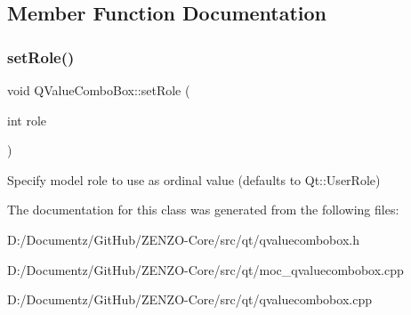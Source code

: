\subsection{Member Function Documentation}
\mbox{\label{class_q_value_combo_box_a9db5bc48951130e1104322de54f55471}} 
\subsubsection{\texorpdfstring{setRole()}{setRole()}}
{\footnotesize\ttfamily void Q\+Value\+Combo\+Box\+::set\+Role (\begin{DoxyParamCaption}\item[{int}]{role }\end{DoxyParamCaption})}

Specify model role to use as ordinal value (defaults to Qt\+::\+User\+Role) 

The documentation for this class was generated from the following files\+:\begin{DoxyCompactItemize}
\item 
D\+:/\+Documentz/\+Git\+Hub/\+Z\+E\+N\+Z\+O-\/\+Core/src/qt/qvaluecombobox.\+h\item 
D\+:/\+Documentz/\+Git\+Hub/\+Z\+E\+N\+Z\+O-\/\+Core/src/qt/moc\+\_\+qvaluecombobox.\+cpp\item 
D\+:/\+Documentz/\+Git\+Hub/\+Z\+E\+N\+Z\+O-\/\+Core/src/qt/qvaluecombobox.\+cpp\end{DoxyCompactItemize}
